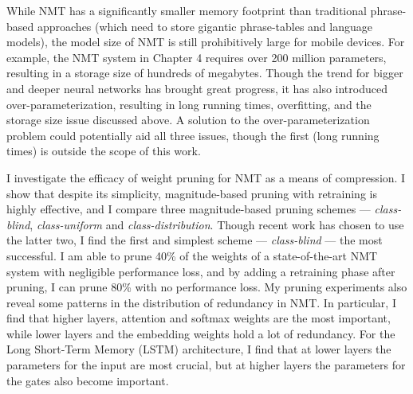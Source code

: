 While NMT has a significantly smaller memory footprint than traditional phrase-based approaches (which need to store gigantic phrase-tables and
language models), the model size of NMT is still prohibitively large for mobile devices.
For example, the NMT system in Chapter 4 \cite{luong15attn}requires over 200 million
parameters, resulting in a storage size of hundreds of megabytes. 
Though the trend for bigger and deeper neural networks has brought great progress, it has also introduced over-parameterization, resulting in long running times, overfitting, and the storage size issue discussed above. 
A solution to the over-parameterization problem could potentially aid all three issues, though the first (long running times) is outside the scope of this work.

I investigate the efficacy of weight pruning for NMT as a means of compression.
I show that despite its simplicity, magnitude-based pruning with retraining is highly effective, and I compare three magnitude-based pruning schemes --- \textit{class-blind}, \textit{class-uniform} and \textit{class-distribution}.
Though recent work has chosen to use the latter two, I find the first and simplest scheme --- \textit{class-blind} --- the most successful.
I am able to prune 40\% of the weights of a state-of-the-art NMT system with negligible performance loss, and by adding a retraining phase after pruning, I can prune 80\% with no performance loss.
My pruning experiments also reveal some patterns in the distribution of
redundancy in NMT. In particular, I find that higher layers, attention and softmax weights are the most important, while lower layers and the embedding weights hold a lot of redundancy. 
For the Long Short-Term Memory (LSTM) architecture, I find that at lower layers the parameters for the input are most crucial, but at higher layers the parameters for the gates also become important.
